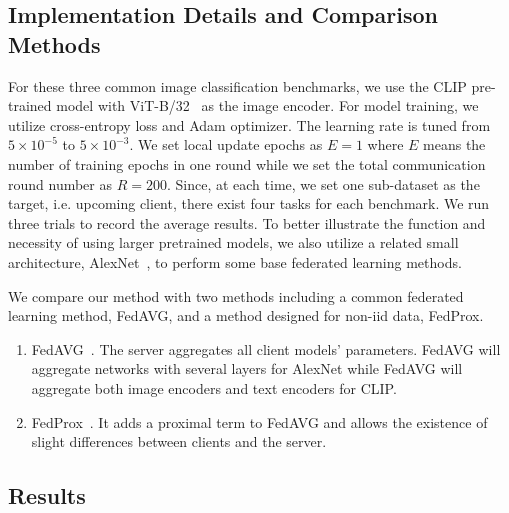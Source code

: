 \documentclass[11pt]{article}
\begin{document}
\subsection{Implementation Details and Comparison Methods}
For these three common image classification benchmarks, we use the CLIP pre-trained model with ViT-B/32~\cite{Jindong-dosovitskiyimage} as the image encoder.
For model training, we utilize cross-entropy loss and Adam optimizer.
The learning rate is tuned from $5\times 10^{-5}$ to $5\times 10^{-3}$.
We set local update epochs as $E=1$ where $E$ means the number of training epochs in one round while we set the total communication round number as $R=200$.
Since, at each time, we set one sub-dataset as the target, i.e. upcoming client, there exist four tasks for each benchmark.
We run three trials to record the average results.
To better illustrate the function and necessity of using larger pretrained models, we also utilize a related small architecture, AlexNet~\cite{Jindong-krizhevsky2012imagenet}, to perform some base federated learning methods.

We compare our method with two methods including a common federated learning method, FedAVG, and a method designed for non-iid data, FedProx.
\begin{enumerate}
    \item FedAVG~\cite{Jindong-mcmahan2017communication}. The server aggregates all client models' parameters. FedAVG will aggregate networks with several layers for AlexNet while FedAVG will aggregate both image encoders and text encoders for CLIP.
    \item FedProx~\cite{Jindong-li2018federated}. It adds a proximal term to FedAVG and allows the existence of slight differences between clients and the server.
\end{enumerate}

\subsection{Results}
\end{document}
